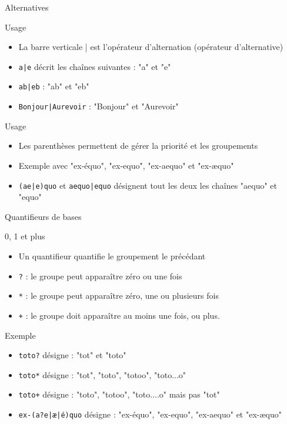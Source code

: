 \def\sectitle{Alternatives}
\def\subsectitle{Usage}
\begin{frame}[containsverbatim]{\sectitle}
\begin{block}{\subsectitle}
\begin{itemize}
\item La barre verticale | est l'opérateur d'alternation (opérateur d'alternative)
\item \verb!a|e! décrit les chaînes suivantes : "a" et "e"
\item \verb!ab|eb! : "ab" et "eb"
\item \verb!Bonjour|Aurevoir! : "Bonjour" et "Aurevoir"
\end{itemize}
\end{block}

\begin{block}{\subsectitle}
\begin{itemize}
\item Les parenthèses permettent de gérer la priorité et les groupements
\item Exemple avec "ex-équo", "ex-equo", "ex-aequo" et "ex-æquo" 
\item \verb!(ae|e)quo! et \verb!aequo|equo! désignent tout les deux les chaînes "aequo" et "equo"
\end{itemize}
\end{block}
\end{frame}



\def\ftitle{Quantifieurs de bases}
\def\blocktitle{0, 1 et plus}
\begin{frame}[containsverbatim]{\ftitle}
\begin{block}{\blocktitle}
\begin{itemize}
\item Un quantifieur quantifie le groupement le précédant
\item \verb!?! : le groupe peut apparaître zéro ou une fois
\item \verb!*! : le groupe peut apparaître zéro, une ou plusieurs fois
\item \verb!+! : le groupe doit apparaître au moins une fois, ou plus. 
\end{itemize}
\end{block}


\def\blocktitle{Exemple}
\begin{block}{\blocktitle}
\begin{itemize}
\item \verb!toto?! désigne : "tot" et "toto"
\item \verb!toto*! désigne : "tot", "toto", "totoo", "toto...o"
\item \verb!toto+! désigne : "toto", "totoo", "toto....o" mais pas "tot"
\item \verb!ex-(a?e|æ|é)quo! désigne : "ex-équo", "ex-equo", "ex-aequo" et "ex-æquo"
\end{itemize}
\end{block}

\end{frame}

